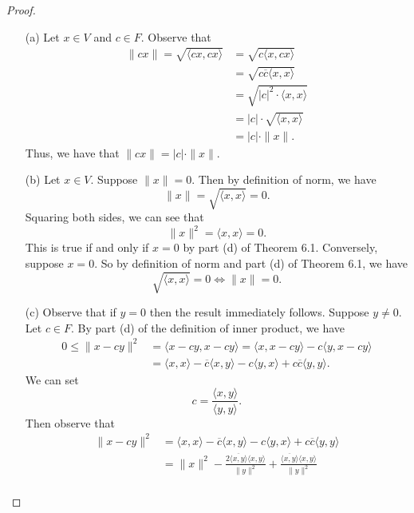 \begin{proof}
\begin{enumerate}
    \item[(a)] Let \( x \in V  \) and \( c \in F  \). Observe that
        \begin{align*}
            \| cx \| = \sqrt{ \langle  cx , cx \rangle }  
                   &= \sqrt{c \langle x , cx \rangle }  \\
                   &= \sqrt{ c \overline{c} \langle x , x \rangle } \\
                   &= \sqrt{ | c |^{2} \cdot \langle x , x \rangle } \\
                   &= | c |  \cdot \sqrt{ \langle x , x \rangle } \\
                   &= | c |  \cdot \| x \|.
        \end{align*}
        Thus, we have that \( \| cx \| = | c  |  \cdot \| x \| \).
    \item[(b)] Let \( x \in V  \). Suppose \( \| x \| = 0   \). Then by definition of norm, we have
        \[ \| x \| = \sqrt{ \langle x , x \rangle } = 0. \]
        Squaring both sides, we can see that 
        \[  \| x \|^{2} = \langle  x , x \rangle = 0. \]
        This is true if and only if \( x = 0  \) by part (d) of Theorem 6.1. Conversely, suppose \( x = 0   \). So by definition of norm and part (d) of Theorem 6.1, we have  
        \[  \sqrt{ \langle x , x \rangle }  = 0 \iff \| x \| = 0. \]
    \item[(c)] Observe that if \( y = 0 \) then the result immediately follows. Suppose \( y \neq 0  \). Let \( c \in F  \). By part (d) of the definition of inner product, we have  
        \begin{align*}
            0 \leq \| x - cy \|^{2} &= \langle x - cy , x-cy \rangle = \langle x  ,  x - cy  \rangle - c \langle  y  ,  x - cy \rangle \\ 
                                    &= \langle x , x \rangle - \overline{c} \langle  x, y  \rangle - c \langle y , x \rangle + c \overline{c} \langle y , y \rangle. 
        \end{align*}
        We can set 
        \[  c = \frac{ \langle x , y \rangle }{ \langle y , y \rangle }. \]
        Then observe that
        \begin{align*}
            \| x - cy \|^{2} &= \langle x , x \rangle - \overline{c} \langle  x , y \rangle - c \langle  y , x \rangle + c \overline{c} \langle y , y \rangle \\
                             &= \|x\|^{2} - \frac{ 2\overline{\langle x , y \rangle} \langle x , y \rangle }{ \|y\|^{2}  } + \frac{ \overline{\langle x , y \rangle} \langle x , y \rangle }{ \|y\|^{2} } \\   

\end{align*}
\end{enumerate}
\end{proof}
